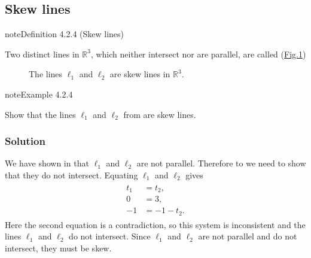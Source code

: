 \documentclass[letterpaper,10pt,english]{jupyterBook}
\let\sphinxpxdimen\pdfpxdimen\else\newdimen\sphinxpxdimen
\begin{document}
\subsection{Skew lines}
\label{\detokenize{_pages/4.1_Lines:skew-lines}}\label{\detokenize{_pages/4.1_Lines:index-4}}\label{_pages/4.1_Lines:skew-lines-definition}
\begin{sphinxadmonition}{note}{Definition 4.2.4 (Skew lines)}



\sphinxAtStartPar
Two distinct lines in \(\mathbb{R}^3\), which neither intersect nor are parallel, are called  (\hyperref[\detokenize{_pages/4.1_Lines:skew-lines-figure}]{Fig.\@ \ref{\detokenize{_pages/4.1_Lines:skew-lines-figure}}})

\begin{figure}[htbp]
\centering
\capstart

\noindent\sphinxincludegraphics[width=350\sphinxpxdimen]{{4_skew_lines}.svg}
\caption{The lines \(\ell_1\) and \(\ell_2\) are skew lines in \(\mathbb{R}^3\).}\label{\detokenize{_pages/4.1_Lines:skew-lines-figure}}\end{figure}
\end{sphinxadmonition}
\label{_pages/4.1_Lines:skew-lines-example}
\begin{sphinxadmonition}{note}{Example 4.2.4}



\sphinxAtStartPar
Show that the lines \(\ell_1\) and \(\ell_2\) from {\hyperref[\detokenize{_pages/4.1_Lines:parallel-lines-example}]{}} are skew lines.
\subsubsection*{Solution}

\sphinxAtStartPar
We have shown in {\hyperref[\detokenize{_pages/4.1_Lines:parallel-lines-example}]{}} that \(\ell_1\) and \(\ell_2\) are not parallel. Therefore to we need to show that they do not intersect. Equating \(\ell_1\) and \(\ell_2\) gives
\begin{equation*}
\begin{split} \begin{align*}
    t_1 &= t_2, \\
    0 &= 3, \\
    -1 &= -1 - t_2.
\end{align*} \end{split}
\end{equation*}
\sphinxAtStartPar
Here the second equation is a contradiction, so this system is inconsistent and the lines \(\ell_1\) and \(\ell_2\) do not intersect. Since \(\ell_1\) and \(\ell_2\) are not parallel and do not intersect, they must be skew.
\end{sphinxadmonition}
\end{document}
